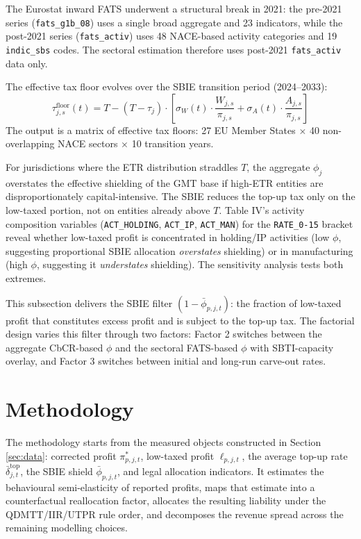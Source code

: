 \documentclass[11pt,a4paper]{article}
\newcommand{\code}[1]{\texttt{#1}}
\begin{document}
The Eurostat inward FATS underwent a structural break in 2021: the pre-2021 series (\code{fats\_g1b\_08}) uses a single broad aggregate and 23 indicators, while the post-2021 series (\code{fats\_activ}) uses 48 NACE-based activity categories and 19 \code{indic\_sbs} codes. The sectoral estimation therefore uses post-2021 \code{fats\_activ} data only.

The effective tax floor evolves over the SBIE transition period (2024--2033):
\begin{equation}\label{eq:floor_transition}
\tau_{j,s}^{\text{floor}}(t) = T - (T - \tau_j) \cdot \left[\sigma_W(t) \cdot \frac{W_{j,s}}{\pi_{j,s}} + \sigma_A(t) \cdot \frac{A_{j,s}}{\pi_{j,s}}\right]
\end{equation}
The output is a matrix of effective tax floors: 27 EU Member States $\times$ 40 non-overlapping NACE sectors $\times$ 10 transition years.

For jurisdictions where the ETR distribution straddles $T$, the aggregate $\phi_j$ overstates the effective shielding of the GMT base if high-ETR entities are disproportionately capital-intensive. The SBIE reduces the top-up tax only on the low-taxed portion, not on entities already above $T$. Table IV's activity composition variables (\code{ACT\_HOLDING}, \code{ACT\_IP}, \code{ACT\_MAN}) for the \code{RATE\_0-15} bracket reveal whether low-taxed profit is concentrated in holding/IP activities (low $\phi$, suggesting proportional SBIE allocation \emph{overstates} shielding) or in manufacturing (high $\phi$, suggesting it \emph{understates} shielding). The sensitivity analysis tests both extremes.

This subsection delivers the SBIE filter $(1 - \bar{\phi}_{p,j,t})$: the fraction of low-taxed profit that constitutes excess profit and is subject to the top-up tax. The factorial design varies this filter through two factors: Factor 2 switches between the aggregate CbCR-based $\phi$ and the sectoral FATS-based $\phi$ with SBTI-capacity overlay, and Factor 3 switches between initial and long-run carve-out rates.

\newpage

\section{Methodology}\label{sec:methodology}

The methodology starts from the measured objects constructed in Section \ref{sec:data}: corrected profit $\pi^{*}_{p,j,t}$, low-taxed profit $\ell_{p,j,t}$, the average top-up rate $\bar{\delta}_{j,t}^{\text{top}}$, the SBIE shield $\bar{\phi}_{p,j,t}$, and legal allocation indicators. It estimates the behavioural semi-elasticity of reported profits, maps that estimate into a counterfactual reallocation factor, allocates the resulting liability under the QDMTT/IIR/UTPR rule order, and decomposes the revenue spread across the remaining modelling choices.
\end{document}
